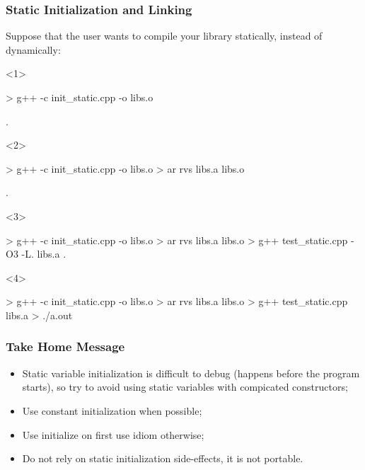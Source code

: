 \documentclass[aspectratio=43]{beamer}
\begin{document}
\begin{frame}[fragile]\frametitle{Static Initialization and Linking}
  Suppose that the user wants to compile your library statically, instead of dynamically:

  \begin{onlyenv}<1>
\begin{Shelllisting}{}
> g++ -c init_static.cpp -o libs.o


.
\end{Shelllisting}
  \end{onlyenv}
  \begin{onlyenv}<2>
\begin{Shelllisting}{}
> g++ -c init_static.cpp -o libs.o
> ar rvs libs.a libs.o

.
\end{Shelllisting}
  \end{onlyenv}
  \begin{onlyenv}<3>
\begin{Shelllisting}{}
> g++ -c init_static.cpp -o libs.o
> ar rvs libs.a libs.o
> g++ test_static.cpp -O3 -L. libs.a
.
\end{Shelllisting}
  \end{onlyenv}
  \begin{onlyenv}<4>
\begin{Shelllisting}{}
> g++ -c init_static.cpp -o libs.o
> ar rvs libs.a libs.o
> g++ test_static.cpp libs.a
> ./a.out
\end{Shelllisting}
  \end{onlyenv}
\end{frame}


\begin{frame}[fragile]\frametitle{Take Home Message}

  \begin{itemize}
  \item Static variable initialization is difficult to debug (happens before the program starts),
    so try to avoid using static variables with compicated constructors;
  \item Use constant initialization when possible;
  \item Use initialize on first use idiom otherwise;
  \item Do not rely on static initialization side-effects, it is not portable.
  \end{itemize}
\end{frame}
\end{document}
